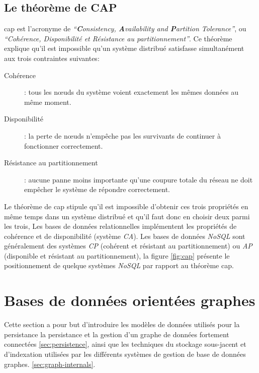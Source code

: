   \subsection{Le théorème de CAP }
  \label{sec:cap}
  \acrshort{cap} \cite{brewer2000towards} est l'acronyme de
  \textit{``\textbf{C}onsistency, \textbf{A}vailability and
    \textbf{P}artition Tolerance''}, ou \textit{``Cohérence,
    Disponibilité et Résistance au partitionnement''}. Ce théorème
  explique qu'il est impossible qu'un système distribué satisfasse
  simultanément aux trois contraintes suivantes:\medskip

  

  \renewcommand{\descriptionlabel}[1]{\hspace{0.5cm}\textbullet~\textsf{#1}}
  \begin{description}
  \item [Cohérence]: tous les nœuds du système voient exactement les
    mêmes données au même moment.

  \item [Disponibilité]: la perte de nœuds n'empêche pas les survivants
    de continuer à fonctionner correctement.

  \item [Résistance au partitionnement]: aucune panne moins importante
    qu'une coupure totale du réseau ne doit empêcher le système de
    répondre correctement.\medskip
  \end{description}
  \enddescription


  Le théorème de \acrshort{cap} stipule qu'il est impossible d'obtenir
  ces trois propriétés en même temps dans un système distribué et
  qu'il faut donc en choisir deux parmi les trois, Les bases de
  données relationnelles implémentent les propriétés de cohérence et
  de disponibilité (système \emph{CA}). Les bases de données
  \emph{NoSQL} sont généralement des systèmes \emph{CP} (cohérent et
  résistant au partitionnement) ou \emph{AP} (disponible et résistant
  au partitionnement), la figure \ref{fig:cap} présente le
  positionnement de quelque systèmes \emph{NoSQL} par rapport au
  théorème \acrshort{cap}.

\section{Bases de données orientées graphes}
\label{sec:graph-database-overview}
Cette section a pour but d'introduire les modèles de données utilisés
pour la persistance la persistance et la gestion d'un graphe de
données fortement connectées \ref{sec:persistence}, ainsi que les
techniques du stockage sous-jacent et d'indexation utilisées par les
différents systèmes de gestion de base de données graphes.
\ref{sec:graph-internals}.\medskip


